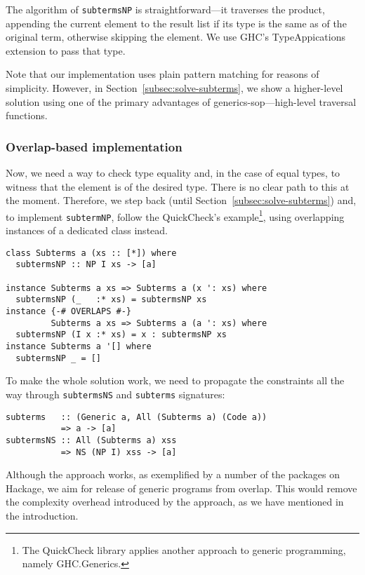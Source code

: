\documentclass[runningheads]{llncs}
\newcommand{\K}[1]{\lstinline{#1}}
\begin{document}
The algorithm of \K{subtermsNP} is straightforward---it traverses the product, appending the current element to the result list if its type is the same as of the original term, otherwise skipping the element. We use GHC's \textsf{TypeAppications} extension to pass that type.

Note that our implementation uses plain pattern matching for reasons of simplicity. However, in Section~\ref{subsec:solve-subterms}, we show a higher-level solution using one of the primary advantages of \textsf{generics-sop}---high-level traversal functions.

\subsubsection{Overlap-based implementation}

Now, we need a way to check type equality and, in the case of equal types, to witness that the element is of the desired type. There is no clear path to this at the moment. Therefore, we step back (until Section~\ref{subsec:solve-subterms}) and, to implement \K{subtermNP}, follow the \textsf{QuickCheck}'s example\footnote{The \textsf{QuickCheck} library applies another approach to generic programming, namely \textsf{GHC.Generics}.}, using overlapping instances of a dedicated class instead.
\begin{lstlisting}
class Subterms a (xs :: [*]) where
  subtermsNP :: NP I xs -> [a]

instance Subterms a xs => Subterms a (x ': xs) where
  subtermsNP (_   :* xs) = subtermsNP xs
instance {-# OVERLAPS #-}
         Subterms a xs => Subterms a (a ': xs) where
  subtermsNP (I x :* xs) = x : subtermsNP xs
instance Subterms a '[] where
  subtermsNP _ = []
\end{lstlisting}

To make the whole solution work, we need to propagate the constraints all the way through \K{subtermsNS} and \K{subterms} signatures:
\begin{lstlisting}
subterms   :: (Generic a, All (Subterms a) (Code a))
           => a -> [a]
subtermsNS :: All (Subterms a) xss
           => NS (NP I) xss -> [a]
\end{lstlisting}

Although the approach works, as exemplified by a number of the packages on Hackage, we aim for release of generic programs from overlap. This would remove the complexity overhead introduced by the approach, as we have mentioned in the introduction.
\end{document}
